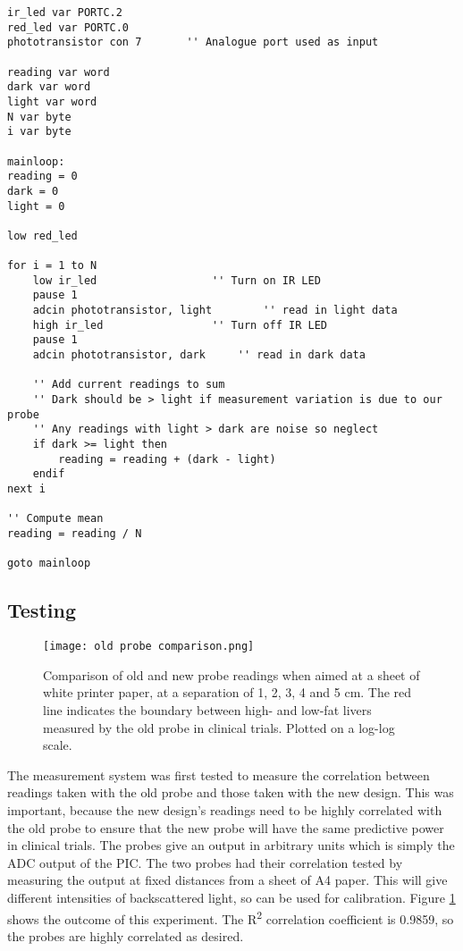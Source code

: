 \begin{lstlisting}
ir_led var PORTC.2
red_led var PORTC.0
phototransistor con 7       '' Analogue port used as input

reading var word
dark var word
light var word
N var byte
i var byte

mainloop:
reading = 0
dark = 0
light = 0

low red_led

for i = 1 to N
    low ir_led					'' Turn on IR LED
    pause 1
    adcin phototransistor, light		'' read in light data
    high ir_led					'' Turn off IR LED
    pause 1
    adcin phototransistor, dark		'' read in dark data
    
    '' Add current readings to sum
    '' Dark should be > light if measurement variation is due to our probe
    '' Any readings with light > dark are noise so neglect
    if dark >= light then
        reading = reading + (dark - light)
    endif
next i  

'' Compute mean
reading = reading / N

goto mainloop
\end{lstlisting}






\subsection{Testing}
\begin{figure}[htb]
	\centering
	\texttt{[image: old probe comparison.png]}
	\caption{Comparison of old and new probe readings when aimed at a sheet of white printer paper, at a separation of 1, 2, 3, 4 and 5 cm. The red line indicates the boundary between high- and low-fat livers measured by the old probe in clinical trials. Plotted on a log-log scale.}
	\label{fig: old probe comparison}
\end{figure}

The measurement system was first tested to measure the correlation between readings taken with the old probe and those taken with the new design. This was important, because the new design's readings need to be highly correlated with the old probe to ensure that the new probe will have the same predictive power in clinical trials. The probes give an output in arbitrary units which is simply the ADC output of the PIC. The two probes had their correlation tested by measuring the output at fixed distances from a sheet of A4 paper. This will give different intensities of backscattered light, so can be used for calibration. Figure \ref{fig: old probe comparison} shows the outcome of this experiment. The R\textsuperscript{2} correlation coefficient is 0.9859, so the probes are highly correlated as desired. \\

